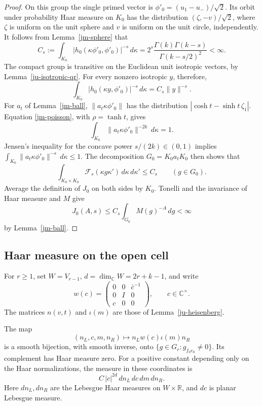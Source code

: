 \begin{proof}
On this group the single primed vector is
\(\phi'_0=(u_1-u_-)/\sqrt2\).
Its orbit under probability Haar measure on \(K_0\) has
the distribution \((\zeta,-v)/\sqrt2\), where \(\zeta\)
is uniform on the unit sphere and \(v\) is uniform on the
unit circle, independently.
It follows from Lemma~\ref{jm-sphere} that
\[
 C_s:=\int_{K_0}|h_0(\kappa\phi'_0,\phi'_0)|^{-s}\,d\kappa
             =2^s\frac{\Gamma(k)\Gamma(k-s)}
                          {\Gamma(k-s/2)^2}<\infty .
\]
The compact group is transitive on the Euclidean unit
isotropic vectors, by Lemma~\ref{ju-isotropic-qr}.
For every nonzero isotropic \(y\), therefore,
\[
 \int_{K_0}|h_0(\kappa y,\phi'_0)|^{-s}\,d\kappa
                                      =C_s\|y\|^{-s}.
\]
For \(a_t\) of Lemma~\ref{jm-ball},
\(\|a_t\kappa\phi'_0\|\) has the distribution
\(|\cosh t-\sinh t\,\zeta_1|\).
Equation \eqref{jm-poisson}, with \(\rho=\tanh t\), gives
\[
             \int_{K_0}\|a_t\kappa\phi'_0\|^{-2k}\,d\kappa=1.
\]
Jensen's inequality for the concave power \(s/(2k)\in(0,1)\)
implies
\(\int_{K_0}\|a_t\kappa\phi'_0\|^{-s}\,d\kappa\leq1\).
The decomposition \(G_0=K_0a_tK_0\) then shows that
\[
 \int_{K_0\times K_0}\mathcal F_s(\kappa g\kappa')\,
                          d\kappa\,d\kappa'\leq C_s
                                     \qquad(g\in G_0).
\]
Average the definition of \(J_0\) on both sides by \(K_0\).
Tonelli and the invariance of Haar measure and \(M\) give
\[
 J_0(A,s)\leq C_s\int_{G_0}M(g)^{-A}\,dg<\infty
\]
by Lemma~\ref{jm-ball}.
\end{proof}

\subsection{Haar measure on the open cell}

For \(r\geq1\), set \(W=V_{r-1}\), \(d=\dim_{\mathbb C}W
=2r+k-1\), and write
\[
 w(c)=
 \begin{pmatrix}0&0&\bar c^{-1}\\0&I&0\\c&0&0\end{pmatrix},
                              \qquad c\in\mathbb C^\times.
\]
The matrices \(n(v,t)\) and \(\iota(m)\) are those of
Lemma~\ref{ju-heisenberg}.

\begin{lemma}\label{jm-cell-haar}
The map
\[
 (n_L,c,m,n_R)\longmapsto n_Lw(c)\iota(m)n_R
\]
is a smooth bijection, with smooth inverse, onto
\(\{g\in G_r:g_{f_0e_0}\ne0\}\).
Its complement has Haar measure zero.
For a positive constant depending only on the Haar
normalizations, the measure in these coordinates is
\begin{equation}\label{jm-haar}
                  C\,|c|^{2d}\,dn_L\,dc\,dm\,dn_R .
\end{equation}
Here \(dn_L,dn_R\) are the Lebesgue Haar measures on
\(W\times\mathbb R\), and \(dc\) is planar Lebesgue measure.
\end{lemma}

